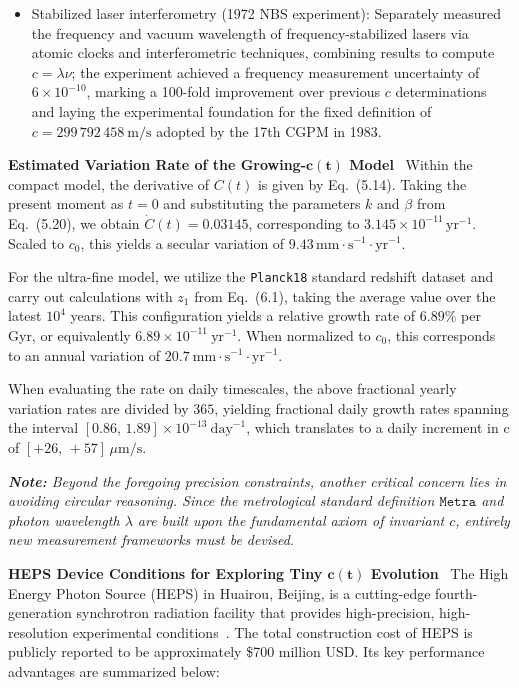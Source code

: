 \documentclass[12pt,leqno]{article}
\begin{document}
{\begin{itemize}
		\item Stabilized laser interferometry (1972 NBS experiment): Separately measured the frequency and vacuum wavelength of frequency-stabilized lasers via atomic clocks and interferometric techniques, combining results to compute $c=\lambda\nu$; the experiment achieved a frequency measurement uncertainty of \(6\times10^{-10}\), marking a 100-fold improvement over previous \(c\) determinations and laying the experimental foundation for the fixed definition of \(c=299\,792\,458\ \mathrm{m/s}\) adopted by the 17th CGPM in 1983.
	\end{itemize}
	
	
	\bigskip
	\textbf{Estimated Variation Rate of the Growing-$\boldsymbol{c(t)}$ Model}\,\,\,
	Within the compact model, the derivative of $C(t)$ is given by Eq.~(5.14). Taking the present moment as $t=0$ and substituting the parameters $k$ and $\beta$ from Eq.~(5.20), we obtain $\dot{C}(t)=0.03145$, corresponding to $3.145 \times 10^{-11}\,\mathrm{yr}^{-1}$. Scaled to $c_0$, this yields a secular variation of $9.43\,\mathrm{mm\!\cdot\!s^{-1}\!\cdot\!yr^{-1}}$.
	
	\medskip
	For the ultra-fine model, we utilize the \texttt{Planck18} standard redshift dataset and carry out calculations with $z_1$ from Eq.~(6.1), taking the average value over the latest $10^4$ years. This configuration yields a relative growth rate of $6.89\%$ per Gyr, or equivalently $6.89 \times 10^{-11}\ \mathrm{yr}^{-1}$. When normalized to $c_0$, this corresponds to an annual variation of $20.7\ \mathrm{mm\!\cdot\!s^{-1}\!\cdot\!yr^{-1}}$.
	
	\medskip
	When evaluating the rate on daily timescales, the above fractional yearly variation rates are divided by $365$, yielding fractional daily growth rates spanning the interval $[0.86,\,1.89]\times 10^{-13}\ \mathrm{day}^{-1}$, which translates to a daily increment in c of  $[+26,\,+57]\, \mu\mathrm{m/s}$.
	
	\medskip
	\textit{\textbf{Note:} Beyond the foregoing precision constraints, another critical concern lies in avoiding circular reasoning. Since the metrological standard definition $\texttt{Metra}$ and photon wavelength $\lambda$ are built upon the fundamental axiom of invariant $c$, entirely new measurement frameworks must be devised.}
	
	
	\medskip
	\bigskip
	\textbf{HEPS Device Conditions for Exploring Tiny $\boldsymbol{c(t)}$ Evolution}\,\,\,
	The High Energy Photon Source (HEPS) in Huairou, Beijing, is a cutting-edge fourth-generation synchrotron radiation facility that provides high-precision, high-resolution experimental conditions~\cite{HEPS:2022}. The total construction cost of HEPS is publicly reported to be approximately \$700 million USD. Its key performance advantages are summarized below:
	
}
\end{document}

